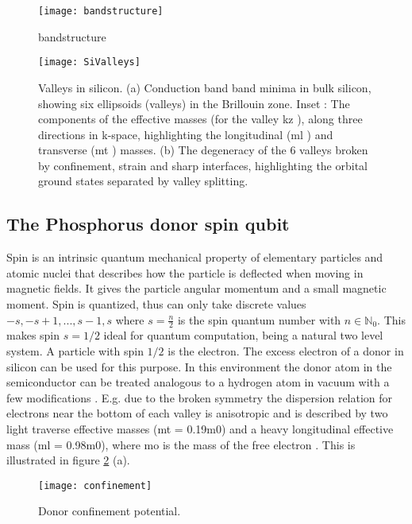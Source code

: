 \begin{figure}
\centering
\texttt{[image: bandstructure]}
\caption{
bandstructure
}
\label{fig:bandstructure}
\end{figure}
 


\begin{figure}
\centering
\texttt{[image: SiValleys]}
\caption{
Valleys in silicon. (a) Conduction band band minima in bulk silicon, showing six ellipsoids
(valleys) in the Brillouin zone. Inset : The components of the effective masses (for the valley kz ), along three
directions in k-space, highlighting the longitudinal (ml ) and transverse (mt ) masses. (b) The degeneracy
of the 6 valleys broken by confinement, strain and sharp interfaces, highlighting the orbital ground states
separated by valley splitting. 
}
\label{fig:sivalleys}
\end{figure}
 

\subsection{The Phosphorus donor spin qubit} \label{sec:donorqubit}

Spin is an intrinsic quantum mechanical property of elementary particles and atomic nuclei that describes how the particle is deflected when moving in magnetic fields. It gives the particle angular momentum and a small magnetic moment. Spin is quantized, thus can only take discrete values $-s, -s+1, ..., s-1, s$ where $s=\frac{n}{2}$ is the spin quantum number with $n\in \mathds{N}_0$. This makes spin $s=1/2$ ideal for quantum computation, being a natural two level system. 
A particle with spin $1/2$ is the electron. The excess electron of a donor in silicon can be used for this purpose. In this environment the donor atom in the semiconductor can be treated analogous to a hydrogen atom in vacuum with a few modifications \cite{Zwanenburg}.
E.g. due to the broken symmetry the dispersion relation for electrons near the bottom of each valley is anisotropic and is described by two light traverse effective masses (mt = 0.19m0) and a heavy longitudinal effective mass (ml = 0.98m0), where mo is the mass of the free electron \cite{d}. This is illustrated in figure \ref{fig:sivalleys} (a).  


\begin{figure}
\centering
\texttt{[image: confinement]}
\caption{
Donor confinement potential. 
}
\label{fig:donorconfinement}
\end{figure}


